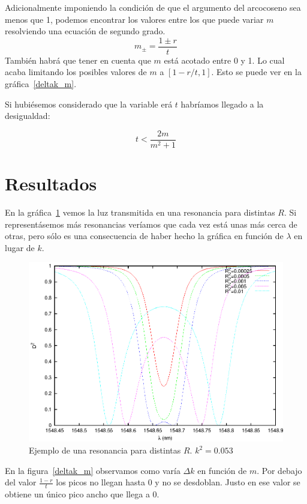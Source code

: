 \documentclass[oneside]{article}
\begin{document}
Adicionalmente imponiendo la condición de que el argumento del arcocoseno sea 
menos que 1, podemos encontrar los valores entre los que puede variar $m$
resolviendo una ecuación de segundo grado.
\begin{equation*}
m_{\pm}=\frac{1\pm r}{t}
\end{equation*}
También habrá que tener en cuenta que $m$ está acotado entre 0 y 1. Lo cual
acaba limitando los posibles valores de $m$ a $[1-r/t,1]$. Esto se puede ver
en la gráfica~\ref{deltak_m}.

Si hubiésemos considerado que la variable erá $t$ habríamos
llegado a la desigualdad:

\begin{equation*}
t < \frac{2m}{m^2+1}
\end{equation*}

\section{Resultados}

En la gráfica~\ref{picos} vemos la luz transmitida en una resonancia para
distintas $R$. Si representásemos más resonancias veríamos que cada vez está
unas más cerca de otras, pero sólo es una consecuencia de haber hecho la gráfica
en función de $\lambda$ en lugar de $k$.
\begin{figure}[h]
    \centering
    \includegraphics{picos.eps}
    \caption{Ejemplo de una resonancia para distintas $R$. $k^2=0.053$}
    \label{picos}
\end{figure}

En la figura~\ref{deltak_m} observamos como varía $\Delta k$ en función de $m$.
Por debajo del valor $\frac{1- r}{t}$ los picos no llegan hasta 0 y no se
desdoblan. Justo en ese valor se obtiene un único pico ancho que llega a 0.
\end{document}
